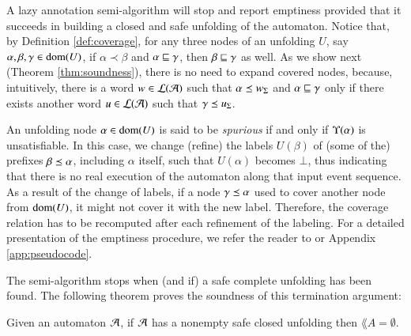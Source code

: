 \documentclass{llncs}
\begin{document}
A lazy annotation semi-algorithm will stop and report emptiness
provided that it succeeds in building a closed and safe unfolding of
the automaton. Notice that, by Definition \ref{def:coverage}, for any
three nodes of an unfolding $U$, say $\alpha,\beta,\gamma \in
\mathrm{dom}(U)$, if $\alpha \prec \beta$ and $\alpha \sqsubseteq \gamma$, then
$\beta \sqsubseteq \gamma$ as well. As we show next (Theorem
\ref{thm:soundness}), there is no need to expand covered nodes,
because, intuitively, there is a word $w \in {\mathcal L}({\mathcal{A}})$ such that
$\alpha \preceq {w}_\Sigma$ and $\alpha \sqsubseteq \gamma$ only if there
exists another word $u \in {\mathcal L}({\mathcal{A}})$ such that $\gamma \preceq
{u}_\Sigma$.

An unfolding node $\alpha \in \mathrm{dom}(U)$ is said to be \emph{spurious}
if and only if $\Upsilon({\alpha})$ is unsatisfiable. In this case, we
change (refine) the labels $U(\beta)$ of (some of the) prefixes $\beta
\preceq \alpha$, including $\alpha$ itself, such that $U(\alpha)$
becomes $\bot$, thus indicating that there is no real execution of the
automaton along that input event sequence. As a result of the change
of labels, if a node $\gamma \preceq \alpha$ used to cover another
node from $\mathrm{dom}(U)$, it might not cover it with the new
label. Therefore, the coverage relation has to be recomputed after
each refinement of the labeling. For a detailed presentation of the
emptiness procedure, we refer the reader to \cite{IosifXu18} or
Appendix \ref{app:pseudocode}.

The semi-algorithm stops when (and if) a safe complete unfolding has
been found. The following theorem proves the soundness of this
termination argument:

\begin{theorem}\label{thm:soundness}
  Given an automaton $\mathcal{A}$, if $\mathcal{A}$ has a nonempty safe closed
  unfolding then $\lang{A} = \emptyset$. 
\end{theorem}
\end{document}
